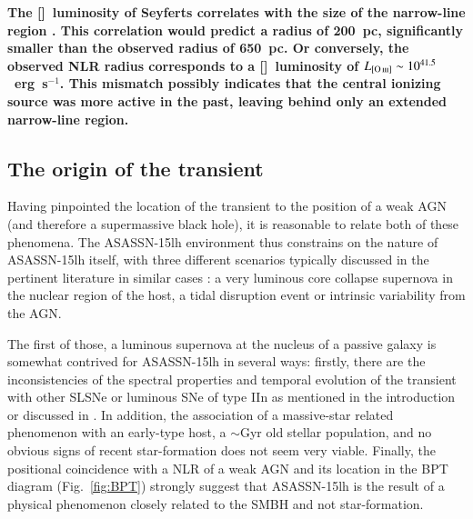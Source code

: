 \documentclass[traditabstract]{aa}
\newcommand{\oiii}{[\ion{O}{iii}]}
\begin{document}
\textbf{The \oiii~luminosity of Seyferts correlates with the size of the narrow-line region \citep[e.g.,][]{2003ApJ...597..768S}. This correlation would predict a radius of 200~pc, significantly smaller than the observed radius of 650~pc. Or conversely, the observed NLR radius corresponds to a \oiii~luminosity of $L_{\oiii}\sim10^{41.5}$~erg~s$^{-1}$. This mismatch possibly indicates that the central ionizing source was more active in the past, leaving behind only an extended narrow-line region.}


\subsection{The origin of the transient}

Having pinpointed the location of the transient to the position of a weak AGN (and therefore a supermassive black hole), it is reasonable to relate both of these phenomena. The ASASSN-15lh environment thus constrains on the nature of ASASSN-15lh itself, with three different scenarios typically discussed in the pertinent literature in similar cases \citep[e.g.,][]{2011ApJ...741...73V, 2011ApJ...735..106D, 2014MNRAS.445.3263H, 2015ApJ...798...12V}: a very luminous core collapse supernova in the nuclear region of the host, a tidal disruption event or intrinsic variability from the AGN.

The first of those, a luminous supernova at the nucleus of a passive galaxy is somewhat contrived for ASASSN-15lh in several ways: firstly, there are the inconsistencies of the spectral properties and temporal evolution of the transient with other SLSNe or luminous SNe of type IIn as mentioned in the introduction or discussed in \citet{2016NatAs...1E...2L}. In addition, the association of a massive-star related phenomenon with an early-type host, a $\sim$Gyr old stellar population, and no obvious signs of recent star-formation does not seem very viable. Finally, the positional coincidence with a NLR of a weak AGN and its location in the BPT diagram (Fig.~\ref{fig:BPT}) strongly suggest that ASASSN-15lh is the result of a physical phenomenon closely related to the SMBH and not star-formation. 
\end{document}
